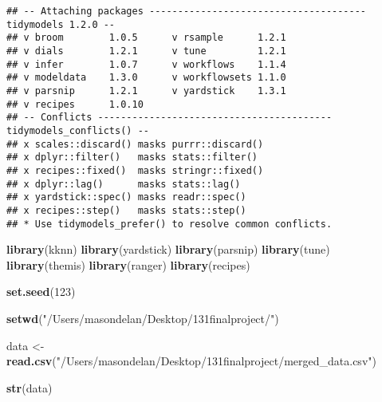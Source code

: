 \documentclass[
]{article}
\newenvironment{Shaded}{\begin{snugshade}}{\end{snugshade}}
\newcommand{\DecValTok}[1]{\textcolor[rgb]{0.00,0.00,0.81}{#1}}
\newcommand{\FunctionTok}[1]{\textcolor[rgb]{0.13,0.29,0.53}{\textbf{#1}}}
\newcommand{\NormalTok}[1]{#1}
\newcommand{\OtherTok}[1]{\textcolor[rgb]{0.56,0.35,0.01}{#1}}
\newcommand{\StringTok}[1]{\textcolor[rgb]{0.31,0.60,0.02}{#1}}
\begin{document}
\begin{verbatim}
## -- Attaching packages -------------------------------------- tidymodels 1.2.0 --
## v broom        1.0.5      v rsample      1.2.1 
## v dials        1.2.1      v tune         1.2.1 
## v infer        1.0.7      v workflows    1.1.4 
## v modeldata    1.3.0      v workflowsets 1.1.0 
## v parsnip      1.2.1      v yardstick    1.3.1 
## v recipes      1.0.10     
## -- Conflicts ----------------------------------------- tidymodels_conflicts() --
## x scales::discard() masks purrr::discard()
## x dplyr::filter()   masks stats::filter()
## x recipes::fixed()  masks stringr::fixed()
## x dplyr::lag()      masks stats::lag()
## x yardstick::spec() masks readr::spec()
## x recipes::step()   masks stats::step()
## * Use tidymodels_prefer() to resolve common conflicts.
\end{verbatim}

\begin{Shaded}
\begin{Highlighting}[]
\FunctionTok{library}\NormalTok{(kknn)}
\FunctionTok{library}\NormalTok{(yardstick)}
\FunctionTok{library}\NormalTok{(parsnip)}
\FunctionTok{library}\NormalTok{(tune)}
\FunctionTok{library}\NormalTok{(themis)}
\FunctionTok{library}\NormalTok{(ranger)}
\FunctionTok{library}\NormalTok{(recipes)}

\FunctionTok{set.seed}\NormalTok{(}\DecValTok{123}\NormalTok{)}

\FunctionTok{setwd}\NormalTok{(}\StringTok{"/Users/masondelan/Desktop/131finalproject/"}\NormalTok{)}

\NormalTok{data }\OtherTok{\textless{}{-}} \FunctionTok{read.csv}\NormalTok{(}\StringTok{"/Users/masondelan/Desktop/131finalproject/merged\_data.csv"}\NormalTok{)}

\FunctionTok{str}\NormalTok{(data)}
\end{Highlighting}
\end{Shaded}
\end{document}
